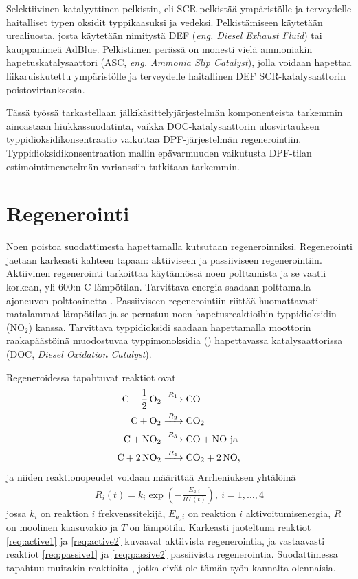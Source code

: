 Selektiivinen katalyyttinen pelkistin, eli SCR pelkistää ympäristölle ja terveydelle haitalliset typen oksidit typpikaasuksi ja vedeksi. Pelkistämiseen käytetään urealiuosta, josta käytetään nimitystä DEF (\emph{eng. Diesel Exhaust Fluid}) tai kauppanimeä AdBlue. Pelkistimen perässä on monesti vielä ammoniakin hapetuskatalysaattori (ASC, \emph{eng. Ammonia Slip Catalyst}), jolla voidaan hapettaa liikaruiskutettu ympäristölle ja terveydelle haitallinen DEF SCR-katalysaattorin poistovirtauksesta.
 \cite{dieselnet_scr}

Tässä työssä tarkastellaan jälkikäsittelyjärjestelmän komponenteista tarkemmin ainoastaan hiukkassuodatinta, vaikka DOC-katalysaattorin ulosvirtauksen typpidioksidikonsentraatio vaikuttaa DPF-järjestelmän regenerointiin. Typpidioksidikonsentraation mallin epävarmuuden vaikutusta DPF-tilan estimointimenetelmän varianssiin tutkitaan tarkemmin.



\section{Regenerointi}
Noen poistoa suodattimesta hapettamalla kutsutaan regeneroinniksi. Regenerointi jaetaan karkeasti kahteen tapaan: aktiiviseen ja passiiviseen regenerointiin. 
Aktiivinen regenerointi tarkoittaa käytännössä noen polttamista ja se
vaatii korkean, yli 600:n \degree C lämpötilan. Tarvittava energia saadaan polttamalla ajoneuvon polttoainetta  \cite{dieselnet_dpf}. Passiiviseen regenerointiin riittää huomattavasti matalammat lämpötilat ja se perustuu noen hapetusreaktioihin typpidioksidin (NO\(_2\)) kanssa. Tarvittava typpidioksidi saadaan hapettamalla moottorin raakapäästöinä muodostuvaa typpimonoksidia () hapettavassa katalysaattorissa (DOC, \emph{Diesel Oxidation Catalyst}).

Regeneroidessa tapahtuvat reaktiot ovat  
\begin{align}
    \ce{C + 1/2 O2 &->[$R_1$] CO }    \label{req:active1}\\
    \ce{C + O2 &->[$R_2$] CO2}    \label{req:active2}\\
    \ce{C + NO2 &->[$R_3$] CO +  NO} \text{ ja }  \label{req:passive1} \\
    \ce{C + 2 NO2 &->[$R_4$] CO2 + 2 NO},    \label{req:passive2} 
\end{align}
ja niiden reaktionopeudet voidaan määrittää Arrheniuksen yhtälöinä \cite{LiuGuanlin2021Roio} \cite{Penghao_regen}
\begin{align}
    R_i(t) =  k_i \exp\left({-\frac{E_{a,i}}{RT(t)}}\right),\ i = 1,\ldots,4
\end{align}
jossa \(k_i\) on reaktion \(i\) frekvenssitekijä, \(E_{a, i}\) on  reaktion \(i\) aktivoitumisenergia, \(R\) on moolinen kaasuvakio ja \(T\) on lämpötila. Karkeasti jaoteltuna reaktiot \eqref{req:active1} ja \eqref{req:active2} kuvaavat aktiivista regenerointia, ja vastaavasti reaktiot \eqref{req:passive1} ja \eqref{req:passive2} passiivista regenerointia.
Suodattimessa tapahtuu  muitakin reaktioita \cite{Penghao_regen}, jotka eivät ole tämän työn kannalta olennaisia.


